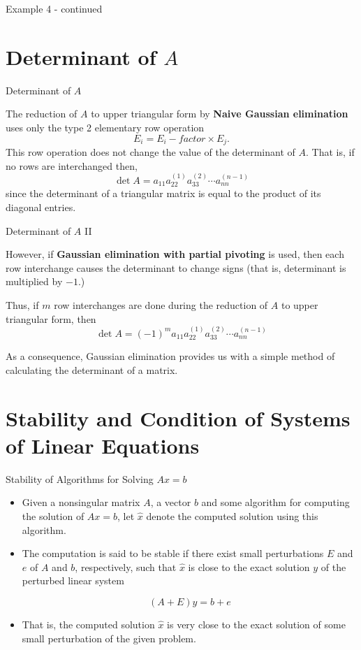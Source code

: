 \documentclass[12pt]{beamer}
\begin{document}
\begin{frame}{Example 4 - continued}


\end{frame}

\section{Determinant of $A$}

\begin{frame}{Determinant of $A$}

The reduction of $A$ to upper triangular form by {\bf Naive Gaussian elimination} uses only the type 2 elementary row operation
\[ E_i = E_i - factor \times E_j. \]
This row operation does not change the value of the determinant of $A$.
That is, if no rows are interchanged then,
\[ \det A = a_{11}a_{22}^{(1)}a_{33}^{(2)} \dotsm a_{nn}^{(n-1)} \]
since the determinant of a triangular matrix is equal to the product of its diagonal entries.

\end{frame}

\begin{frame}{Determinant of $A$ II}

However, if {\bf Gaussian elimination with partial pivoting} is used, then each row interchange causes the determinant to change signs 
(that is, determinant is multiplied by $-1$.)

Thus, if $m$ row interchanges are done during the reduction of $A$ to upper triangular form, then
\[ \det A = (-1)^m a_{11}a_{22}^{(1)}a_{33}^{(2)} \dotsm a_{nn}^{(n-1)} \]

As a consequence, Gaussian elimination provides us with a simple method of calculating the determinant of a matrix.

\end{frame}

\section{Stability and Condition of Systems of Linear Equations}

\begin{frame}{Stability of Algorithms for Solving $Ax=b$}

\begin{itemize}
\item{Given a nonsingular matrix $A$, a vector $b$ and some algorithm for computing the solution of $Ax=b$,  let $\hat{x}$  
denote the computed solution using this algorithm.}
\item{The computation is said to be stable if there exist small perturbations $E$ and $e$ of $A$ and $b$, respectively, such that $\hat{x}$
 is close to the exact solution $y$ of the perturbed linear system

\[ (A+E)y=b+e \]}

\item{That is, the computed solution $\hat{x}$ is very close to the exact solution of some small perturbation of the given problem.}
\end{itemize}
\end{frame}
\end{document}
